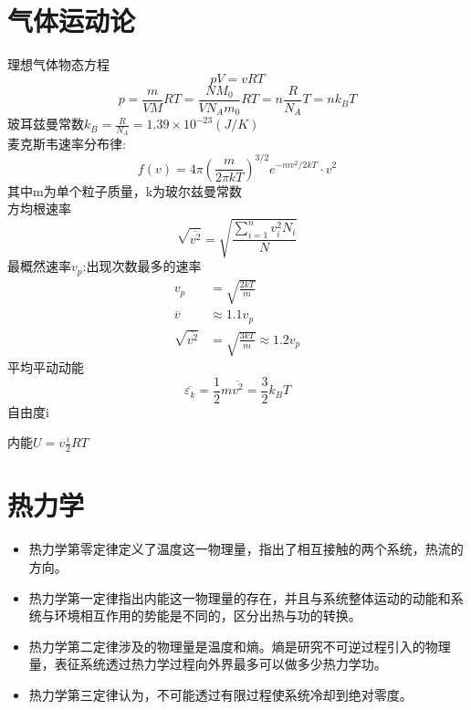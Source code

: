 \documentclass{article}
\begin{document}
    \section{气体运动论}
    理想气体物态方程
    \[
    pV=vRT    
    \]
    \[
      p=\frac{m}{VM}RT=\frac{NM_0}{VN_Am_0}RT=n\frac{R}{N_A}T=nk_BT  
    \]
    玻耳兹曼常数$k_B=\frac{R}{N_A}=1.39 \times 10^{-23} (J/K)$\\
    麦克斯韦速率分布律:
    \[
      f(v)=4\pi (\frac{m}{2\pi kT})^{3/2}e^{-mv^2/2kT}\cdot v^2  
    \]
    其中m为单个粒子质量，k为玻尔兹曼常数\\
    方均根速率
    \[
    \sqrt{\overline{v^2}}=\sqrt{\frac{\sum\limits_{i=1}^n v_i^2N_i}{N}}    
    \]
    最概然速率$v_p$:出现次数最多的速率
    \begin{align*}
             v_p&=\sqrt{\frac{2kT}{m}}    \\
             \overline{v} &\approx 1.1v_p \\
             \sqrt{\overline{v^2}}&=\sqrt{\frac{3kT}{m}} \approx 1.2v_p 
    \end{align*}
    平均平动动能
    \[
    \overline{\varepsilon_k}=\frac{1}{2}m\overline{v^2}=\frac{3}{2}k_BT
    \]
    自由度i
    \begin{table}[H]
        \centering
        \end{table}
    内能$U=v\frac{i}{2}RT$
    \section{热力学}
    \begin{itemize}
        \item 热力学第零定律定义了温度这一物理量，指出了相互接触的两个系统，热流的方向。
        \item 热力学第一定律指出内能这一物理量的存在，并且与系统整体运动的动能和系统与环境相互作用的势能是不同的，区分出热与功的转换。
        \item 热力学第二定律涉及的物理量是温度和熵。熵是研究不可逆过程引入的物理量，表征系统透过热力学过程向外界最多可以做多少热力学功。
        \item 热力学第三定律认为，不可能透过有限过程使系统冷却到绝对零度。
    \end{itemize}
\end{document}
